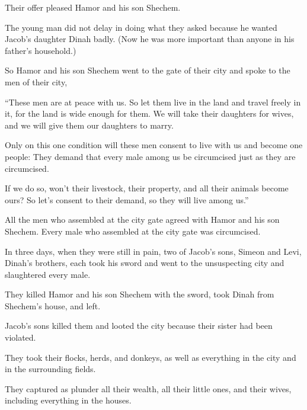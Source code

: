 \begin{scripture}
 Their offer pleased Hamor and his son Shechem.
 The young man did not delay in doing what they asked because he wanted Jacob's daughter Dinah badly. (Now he was more important than anyone in his father's household.)
 So Hamor and his son Shechem went to the gate of their city and spoke to the men of their city,
 ``These men are at peace with us. So let them live in the land and travel freely in it, for the land is wide enough for them. We will take their daughters for wives, and we will give them our daughters to marry.
 Only on this one condition will these men consent to live with us and become one people: They demand that every male among us be circumcised just as they are circumcised.
 If we do so, won't their livestock, their property, and all their animals become ours? So let's consent to their demand, so they will live among us.''
\everypar{}

 All the men who assembled at the city gate agreed with Hamor and his son Shechem. Every male who assembled at the city gate was circumcised.
 In three days, when they were still in pain, two of Jacob's sons, Simeon and Levi, Dinah's brothers, each took his sword and went to the unsuspecting city and slaughtered every male.
 They killed Hamor and his son Shechem with the sword, took Dinah from Shechem's house, and left.
 Jacob's sons killed them and looted the city because their sister had been violated.
 They took their flocks, herds, and donkeys, as well as everything in the city and in the surrounding fields.
 They captured as plunder all their wealth, all their little ones, and their wives, including everything in the houses.
\everypar{}


\end{scripture}

